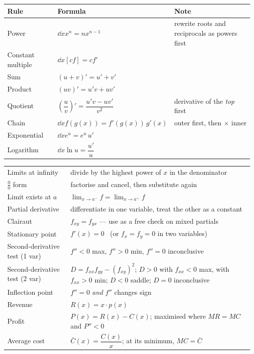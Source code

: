 \begin{center}
\small
\begin{tabular}{@{}L{4.4cm} L{5.4cm} L{5.4cm}@{}}
\toprule
\textbf{Rule} & \textbf{Formula} & \textbf{Note} \\
\midrule
Power    & $\dd{}{x}x^{n}=nx^{n-1}$ & rewrite roots and reciprocals as powers first \\
Constant multiple & $\dd{}{x}\left[cf\right]=cf'$ & \\
Sum      & $(u+v)'=u'+v'$ & \\
Product  & $(uv)'=u'v+uv'$ & \\
Quotient & $\left(\dfrac uv\right)'=\dfrac{u'v-uv'}{v^{2}}$ & derivative of the \emph{top} first \\
Chain    & $\dd{}{x}f(g(x))=f'(g(x))\,g'(x)$ & outer first, then $\times$ inner \\
Exponential & $\dd{}{x}e^{u}=e^{u}\,u'$ & \\
Logarithm & $\dd{}{x}\ln u=\dfrac{u'}{u}$ & \\
\bottomrule
\end{tabular}
\end{center}

\medskip
\begin{center}
\small
\begin{tabular}{@{}L{5.0cm} L{10.6cm}@{}}
\toprule
Limits at infinity & divide by the highest power of $x$ in the denominator \\
$\tfrac00$ form & factorise and cancel, then substitute again \\
Limit exists at $a$ & $\displaystyle\lim_{x\to a^{-}}f=\lim_{x\to a^{+}}f$ \\
Partial derivative & differentiate in one variable, treat the other as a constant \\
Clairaut & $f_{xy}=f_{yx}$ --- use as a free check on mixed partials \\
Stationary point & $f'(x)=0$ \ (or $f_x=f_y=0$ in two variables) \\
Second-derivative test (1 var) & $f''<0$ max, $f''>0$ min, $f''=0$ inconclusive \\
Second-derivative test (2 var) & $D=f_{xx}f_{yy}-(f_{xy})^{2}$; $D>0$ with
  $f_{xx}<0$ max, with $f_{xx}>0$ min; $D<0$ saddle; $D=0$ inconclusive \\
Inflection point & $f''=0$ \emph{and} $f''$ changes sign \\
Revenue & $R(x)=x\cdot p(x)$ \\
Profit & $P(x)=R(x)-C(x)$; maximised where $MR=MC$ and $P''<0$ \\
Average cost & $\bar{C}(x)=\dfrac{C(x)}{x}$; at its minimum, $MC=\bar{C}$ \\
\bottomrule
\end{tabular}
\end{center}

